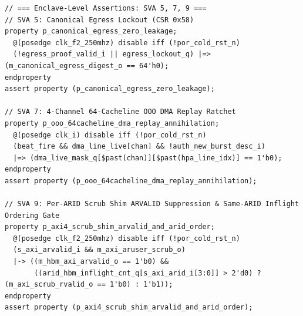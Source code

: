 \documentclass[10pt,twocolumn]{article}
\theoremstyle{spectralthm}
\begin{document}
\begin{lstlisting}
// === Enclave-Level Assertions: SVA 5, 7, 9 ===
// SVA 5: Canonical Egress Lockout (CSR 0x58)
property p_canonical_egress_zero_leakage;
  @(posedge clk_f2_250mhz) disable iff (!por_cold_rst_n)
  (!egress_proof_valid_i || egress_lockout_q) |=> (m_canonical_egress_digest_o == 64'h0);
endproperty
assert property (p_canonical_egress_zero_leakage);

// SVA 7: 4-Channel 64-Cacheline OOO DMA Replay Ratchet
property p_ooo_64cacheline_dma_replay_annihilation;
  @(posedge clk_i) disable iff (!por_cold_rst_n)
  (beat_fire && dma_line_live[chan] && !auth_new_burst_desc_i)
  |=> (dma_live_mask_q[$past(chan)][$past(hpa_line_idx)] == 1'b0);
endproperty
assert property (p_ooo_64cacheline_dma_replay_annihilation);

// SVA 9: Per-ARID Scrub Shim ARVALID Suppression & Same-ARID Inflight Ordering Gate
property p_axi4_scrub_shim_arvalid_and_arid_order;
  @(posedge clk_f2_250mhz) disable iff (!por_cold_rst_n)
  (s_axi_arvalid_i && m_axi_aruser_scrub_o)
  |-> ((m_hbm_axi_arvalid_o == 1'b0) &&
       ((arid_hbm_inflight_cnt_q[s_axi_arid_i[3:0]] > 2'd0) ? (m_axi_scrub_rvalid_o == 1'b0) : 1'b1));
endproperty
assert property (p_axi4_scrub_shim_arvalid_and_arid_order);
\end{lstlisting}
\end{document}
